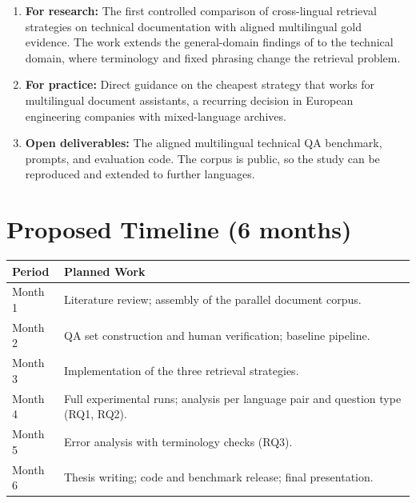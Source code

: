 \documentclass[10pt,a4paper]{article}
\begin{document}
\begin{enumerate}
    \item \textbf{For research:} The first controlled comparison of cross-lingual retrieval strategies on technical documentation with aligned multilingual gold evidence. The work extends the general-domain findings of \cite{chirkova2024} to the technical domain, where terminology and fixed phrasing change the retrieval problem.
    \item \textbf{For practice:} Direct guidance on the cheapest strategy that works for multilingual document assistants, a recurring decision in European engineering companies with mixed-language archives.
    \item \textbf{Open deliverables:} The aligned multilingual technical QA benchmark, prompts, and evaluation code. The corpus is public, so the study can be reproduced and extended to further languages.
\end{enumerate}

\section{Proposed Timeline (6 months)}

\begin{tabularx}{\textwidth}{|p{2.6cm}|X|}
\hline
\rowcolor{lightgray}
\textbf{Period} & \textbf{Planned Work} \\
\hline
Month 1 & Literature review; assembly of the parallel document corpus. \\
\hline
Month 2 & QA set construction and human verification; baseline pipeline. \\
\hline
Month 3 & Implementation of the three retrieval strategies. \\
\hline
Month 4 & Full experimental runs; analysis per language pair and question type (RQ1, RQ2). \\
\hline
Month 5 & Error analysis with terminology checks (RQ3). \\
\hline
Month 6 & Thesis writing; code and benchmark release; final presentation. \\
\hline
\end{tabularx}
\end{document}
